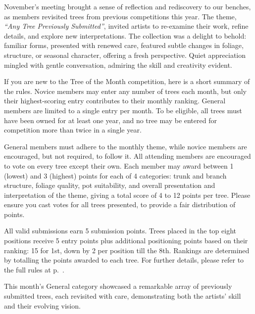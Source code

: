 \label{2025-11-contest}
\noindent
November's meeting brought a sense of reflection and rediscovery to our benches, as members revisited trees from previous competitions this year.
The theme, \textit{``Any Tree Previously Submitted''}, invited artists to re\--examine their work, refine details, and explore new interpretations.
The collection was a delight to behold: familiar forms, presented with renewed care, featured subtle changes in foliage, structure, or seasonal character, offering a fresh perspective.
Quiet appreciation mingled with gentle conversation, admiring the skill and creativity evident.

If you are new to the Tree of the Month competition, here is a short summary of the rules.
Novice members may enter any number of trees each month, but only their highest\--scoring entry contributes to their monthly ranking.
General members are limited to a single entry per month.
To be eligible, all trees must have been owned for at least one year, and no tree may be entered for competition more than twice in a single year.

General members must adhere to the monthly theme, while novice members are encouraged, but not required, to follow it.
All attending members are encouraged to vote on every tree except their own.
Each member may award between 1 (lowest) and 3 (highest) points for each of 4 categories: trunk and branch structure, foliage quality, pot suitability, and overall presentation and interpretation of the theme, giving a total score of 4 to 12 points per tree.
Please ensure you cast votes for all trees presented, to provide a fair distribution of points.

All valid submissions earn 5 submission points.
Trees placed in the top eight positions receive 5 entry points plus additional positioning points based on their ranking: 15 for 1st, down by 2 per position till the 8th.
Rankings are determined by totalling the points awarded to each tree.
For further details, please refer to the full rules at p.~\pageref{2025-11-rules}.

\medskip
{}
\noindent
This month's General category showcased a remarkable array of previously submitted trees, each revisited with care, demonstrating both the artists' skill and their evolving vision.

